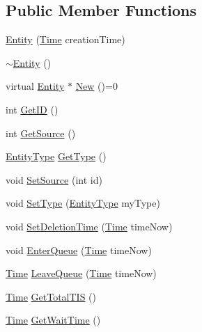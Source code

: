 \subsection*{Public Member Functions}
\begin{DoxyCompactItemize}
\item 
\hyperlink{class_entity_afb6488f2bb29b3e730459246e005dacd}{Entity} (\hyperlink{_simulation_executive_8h_ac2d3e0ba793497bcca555c7c2cf64ff3}{Time} creation\+Time)
\item 
\hyperlink{class_entity_adf6d3f7cb1b2ba029b6b048a395cc8ae}{$\sim$\+Entity} ()
\item 
virtual \hyperlink{class_entity}{Entity} $\ast$ \hyperlink{class_entity_ab8dc894a31d5c72219fa070345d7c383}{New} ()=0
\item 
int \hyperlink{class_entity_a8ed56bc59a6c2b0bd01eda3d274a1fac}{Get\+ID} ()
\item 
int \hyperlink{class_entity_a22d4fe26b229f7720f5204eeadffb1b2}{Get\+Source} ()
\item 
\hyperlink{_entity_8h_ad79a57ed3105eb60d991a1aeb4a9dc44}{Entity\+Type} \hyperlink{class_entity_a6618c119290b237bd6f9e903d029405d}{Get\+Type} ()
\item 
void \hyperlink{class_entity_ad08cf1231dbd8127e086bb803bdb3d5a}{Set\+Source} (int id)
\item 
void \hyperlink{class_entity_a91d4a101d4de57229710334b738bda29}{Set\+Type} (\hyperlink{_entity_8h_ad79a57ed3105eb60d991a1aeb4a9dc44}{Entity\+Type} my\+Type)
\item 
void \hyperlink{class_entity_a5c0dc393f667e2af24cd11d7b4bbd82c}{Set\+Deletion\+Time} (\hyperlink{_simulation_executive_8h_ac2d3e0ba793497bcca555c7c2cf64ff3}{Time} time\+Now)
\item 
void \hyperlink{class_entity_a957592ba81c76d59f622a887fee36e8d}{Enter\+Queue} (\hyperlink{_simulation_executive_8h_ac2d3e0ba793497bcca555c7c2cf64ff3}{Time} time\+Now)
\item 
\hyperlink{_simulation_executive_8h_ac2d3e0ba793497bcca555c7c2cf64ff3}{Time} \hyperlink{class_entity_ae05b43362e61b48a4a2ec5f629730029}{Leave\+Queue} (\hyperlink{_simulation_executive_8h_ac2d3e0ba793497bcca555c7c2cf64ff3}{Time} time\+Now)
\item 
\hyperlink{_simulation_executive_8h_ac2d3e0ba793497bcca555c7c2cf64ff3}{Time} \hyperlink{class_entity_abaed105c13bcd367823d4c1167e3042a}{Get\+Total\+T\+IS} ()
\item 
\hyperlink{_simulation_executive_8h_ac2d3e0ba793497bcca555c7c2cf64ff3}{Time} \hyperlink{class_entity_ae3fc482f0412da20727709c6659c8768}{Get\+Wait\+Time} ()
\end{DoxyCompactItemize}

